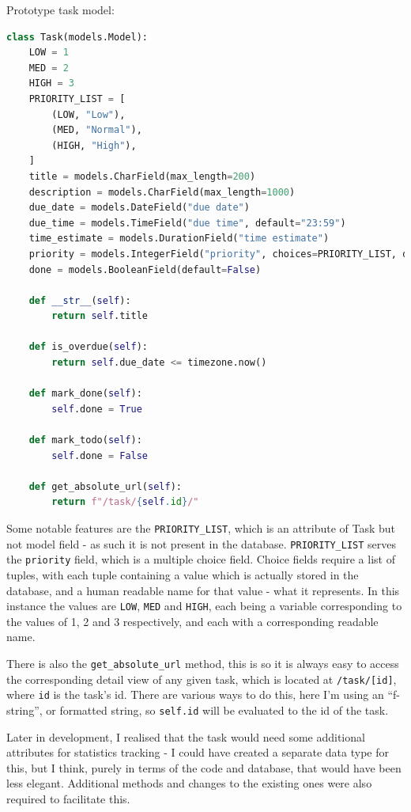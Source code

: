 \documentclass{article}
\begin{document}
Prototype task model:
\begin{lstlisting}[language=Python]
class Task(models.Model):
    LOW = 1
    MED = 2
    HIGH = 3
    PRIORITY_LIST = [
        (LOW, "Low"),
        (MED, "Normal"),
        (HIGH, "High"),
    ]
    title = models.CharField(max_length=200)
    description = models.CharField(max_length=1000)
    due_date = models.DateField("due date")
    due_time = models.TimeField("due time", default="23:59")
    time_estimate = models.DurationField("time estimate")
    priority = models.IntegerField("priority", choices=PRIORITY_LIST, default=2)
    done = models.BooleanField(default=False)

    def __str__(self):
        return self.title

    def is_overdue(self):
        return self.due_date <= timezone.now()

    def mark_done(self):
        self.done = True

    def mark_todo(self):
        self.done = False

    def get_absolute_url(self):
        return f"/task/{self.id}/"
\end{lstlisting}

Some notable features are the \texttt{PRIORITY\_LIST},
which is an attribute of Task but not model field -
as such it is not present in the database.
\texttt{PRIORITY\_LIST} serves the \texttt{priority} field,
which is a multiple choice field.
Choice fields require a list of tuples,
with each tuple containing a value which is actually stored in the database,
and a human readable name for that value - what it represents.
In this instance the values are \texttt{LOW}, \texttt{MED} and \texttt{HIGH},
each being a variable corresponding to the values of 1, 2 and 3 respectively,
and each with a corresponding readable name.

There is also the \texttt{get\_absolute\_url} method,
this is so it is always easy to access the corresponding detail view of any given task,
which is located at \texttt{/task/[id]}, where \texttt{id} is the task's id.
There are various ways to do this,
here I'm using an ``f-string'',
or formatted string,
so \texttt{{self.id}} will be evaluated to the id of the task.

Later in development,
I realised that the task would need some additional attributes for statistics tracking -
I could have created a separate data type for this,
but I think,
purely in terms of the code and database,
that would have been less elegant.
Additional methods and changes to the existing ones were also required to facilitate this.
\end{document}
